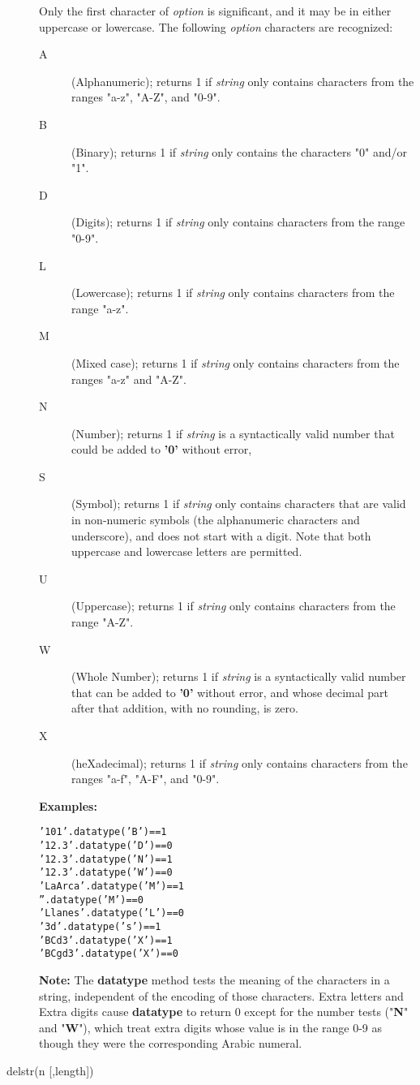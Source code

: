 \begin{description}
Only the first character of \emph{option} is significant, and it may
be in either uppercase or lowercase.
The following \emph{option} characters are recognized:
\begin{description}
\item[A]\label{refdta}
(Alphanumeric); returns 1 if \emph{string} only contains
characters from the ranges "a-z", "A-Z", and "0-9".
\item[B]\label{refdtb}
(Binary); returns 1 if \emph{string} only contains the
characters "0" and/or "1".
\item[D]\label{refdtd}
(Digits); returns 1 if \emph{string} only contains
characters from the range "0-9".
\item[L]\label{refdtl}
(Lowercase); returns 1 if \emph{string} only contains
characters from the range "a-z".
\item[M]\label{refdtm}
(Mixed case); returns 1 if \emph{string} only contains
characters from the ranges "a-z" and "A-Z".
\item[N]\label{refdtn}
(Number); returns 1 if \emph{string} is a syntactically valid
\nr{} number that could be added to \textbf{'0'} without error,
\item[S]\label{refdts}
(Symbol); returns 1 if \emph{string} only contains characters
that are valid in non-numeric symbols (the alphanumeric characters and
underscore), and does not start with a digit.  Note that both uppercase
and lowercase letters are permitted.
\item[U]\label{refdtu}
(Uppercase); returns 1 if \emph{string} only contains
characters from the range "A-Z".
\item[W]\label{refdtw}
(Whole Number); returns 1 if \emph{string} is a syntactically valid
\nr{} number that can be added to \textbf{'0'} without error, and
whose decimal part after that addition, with no rounding, is zero.
\item[X]\label{refdtx}
(heXadecimal); returns 1 if \emph{string} only contains
characters from the ranges "a-f", "A-F", and "0-9".
\end{description}
 
\textbf{Examples:}
\begin{alltt}
'101'.datatype('B')    == 1
'12.3'.datatype('D')   == 0
'12.3'.datatype('N')   == 1
'12.3'.datatype('W')   == 0
'LaArca'.datatype('M') == 1
''.datatype('M')       == 0
'Llanes'.datatype('L') == 0
'3 d'.datatype('s')    == 1
'BCd3'.datatype('X')   == 1
'BCgd3'.datatype('X')  == 0
\end{alltt}
\textbf{Note: }The \textbf{datatype} method tests the meaning of the characters
in a string, independent of the encoding of those characters.  Extra
letters and Extra digits cause \textbf{datatype} to return 0 except
for the number tests ("\textbf{N}" and "\textbf{W}"),
which treat extra digits whose value is in the range 0-9 as though they
were the corresponding Arabic numeral.
\item[delstr(n [,length{]})]\label{refdelstr}


\end{description}
